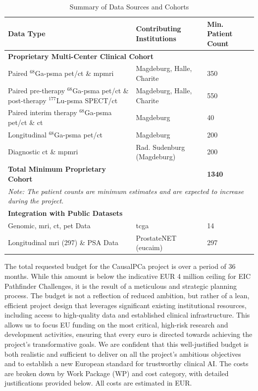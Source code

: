 \documentclass[11pt, a4paper]{article}
\begin{document}
\begin{table}[H]
\caption{Summary of Data Sources and Cohorts}
\label{tab:data}
\begin{tabular}{p{} p{} p{}}
\toprule
\textbf{Data Type} & \textbf{Contributing Institutions} & \textbf{Min. Patient Count} \\
\midrule
\multicolumn{3}{l}{\textbf{Proprietary Multi-Center Clinical Cohort}} \\
\midrule
Paired $^{68}$Ga-\gls{psma} \gls{pet}/\gls{ct} \& mp\gls{mri} & Magdeburg, Halle, Charite & 350 \\
\cmidrule(lr){1-3}
Paired pre-therapy $^{68}$Ga-\gls{psma} \gls{pet}/\gls{ct} \& post-therapy $^{177}$Lu-\gls{psma} SPECT/\gls{ct} & Magdeburg, Halle, Charite & 550 \\
\cmidrule(lr){1-3}
Paired interim therapy $^{68}$Ga-\gls{psma} \gls{pet}/\gls{ct} \& \gls{ct} & Magdeburg & 40 \\
\cmidrule(lr){1-3}
Longitudinal $^{68}$Ga-\gls{psma} \gls{pet}/\gls{ct} & Magdeburg & 200 \\
\cmidrule(lr){1-3}
Diagnostic \gls{ct} \& mp\gls{mri} & Rad. Sudenburg (Magdeburg) & 200 \\
\midrule
\textbf{Total Minimum Proprietary Cohort} & & \textbf{1340} \\
\midrule
\multicolumn{3}{p{\dimexpr\linewidth-2\tabcolsep}}{\small\textit{Note: The patient counts are minimum estimates and are expected to increase during the project.}} \\
\midrule
\multicolumn{3}{l}{\textbf{Integration with Public Datasets}} \\
\midrule
Genomic, \gls{mri}, \gls{ct}, \gls{pet} Data & \gls{tcga} \cite{zuley2016cancer} & 14 \\
\cmidrule(lr){1-3}
Longitudinal \gls{mri} (297) \& PSA Data & ProstateNET (\gls{eucaim}) \cite{prostateNetArchive} & 297 \\
\bottomrule
\end{tabular}
\end{table}

The total requested budget for the CausalPCa project is \textbf{} over a period of 36 months. While this amount is below the indicative EUR 4 million ceiling for EIC Pathfinder Challenges, it is the result of a meticulous and strategic planning process. The budget is not a reflection of reduced ambition, but rather of a lean, efficient project design that leverages significant existing institutional resources, including access to high-quality data and established clinical infrastructure. This allows us to focus EU funding on the most critical, high-risk research and development activities, ensuring that every euro is directed towards achieving the project's transformative goals. We are confident that this well-justified budget is both realistic and sufficient to deliver on all the project's ambitious objectives and to establish a new European standard for trustworthy clinical AI. The costs are broken down by Work Package (WP) and cost category, with detailed justifications provided below. All costs are estimated in EUR.
\end{document}
